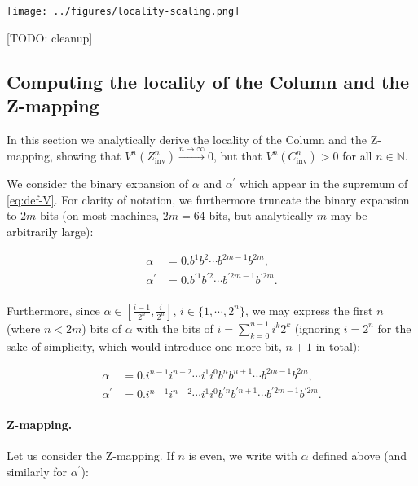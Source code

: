 \documentclass[10pt,letterpaper]{article}
\begin{document}
\texttt{[image: ../figures/locality-scaling.png]}

[TODO: cleanup]
\endif

\subsection{Computing the locality of the Column and the Z-mapping}

In this section we analytically derive the locality of the Column and the Z-mapping, showing that $V^n(Z^n_\textrm{inv}) \xrightarrow{n \to \infty} 0$, but that $V^n(C^n_\textrm{inv}) > 0$ for all $n \in \mathbb{N}$.

We consider the binary expansion of $\alpha$ and $\alpha^\prime$ which appear in the supremum of \autoref{eq:def-V}. For clarity of notation, we furthermore truncate the binary expansion to $2m$ bits (on most machines, $2m=64$ bits, but analytically $m$ may be arbitrarily large):

\begin{equation*} \begin{aligned}
\alpha &= 0. b^1 b^2 \cdots b^{2m-1} b^{2m},\\
\alpha^\prime &= 0. b^{\prime 1} b^{\prime 2} \cdots b^{\prime 2m-1} b^{\prime 2m}. \\
\end{aligned} \end{equation*}

Furthermore, since $\alpha \in \left[\frac{i-1}{2^n}, \frac{i}{2^n} \right],\, i \in \{1, \cdots, 2^n\}$, we may express the first $n$ (where $n < 2m$) bits of $\alpha$ with the bits of $i=\sum_{k=0}^{n-1} i^k 2^k$ (ignoring $i=2^n$ for the sake of simplicity, which would introduce one more bit, $n+1$ in total):

\begin{equation*} \begin{aligned}
\alpha &= 0. i^{n-1} i^{n-2} \cdots i^1 i^0 b^n b^{n+1} \cdots b^{2m-1} b^{2m},\\
\alpha^\prime &= 0. i^{n-1} i^{n-2} \cdots i^1 i^0 b^{\prime n} b^{\prime n+1} \cdots b^{\prime 2m-1} b^{\prime 2m}.
\end{aligned} \end{equation*}

\paragraph{Z-mapping.} Let us consider the Z-mapping. If $n$ is even, we write with $\alpha$ defined above (and similarly for $\alpha^\prime$):
\end{document}
